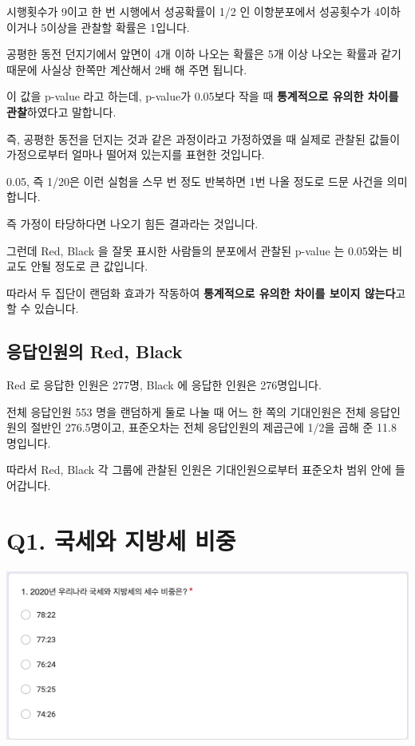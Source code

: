 \documentclass[
]{book}
\begin{document}
시행횟수가 9이고 한 번 시행에서 성공확률이 1/2 인 이항분포에서 성공횟수가 4이하이거나 5이상을 관찰할 확률은 1입니다.

공평한 동전 던지기에서 앞면이 4개 이하 나오는 확률은 5개 이상 나오는 확률과 같기 때문에 사실상 한쪽만 계산해서 2배 해 주면 됩니다.

이 값을 p-value 라고 하는데, p-value가 0.05보다 작을 때 \textbf{통계적으로 유의한 차이를 관찰}하였다고 말합니다.

즉, 공평한 동전을 던지는 것과 같은 과정이라고 가정하였을 때 실제로 관찰된 값들이 가정으로부터 얼마나 떨어져 있는지를 표현한 것입니다.

0.05, 즉 1/20은 이런 실험을 스무 번 정도 반복하면 1번 나올 정도로 드문 사건을 의미합니다.

즉 가정이 타당하다면 나오기 힘든 결과라는 것입니다.

그런데 Red, Black 을 잘못 표시한 사람들의 분포에서 관찰된 p-value 는 0.05와는 비교도 안될 정도로 큰 값입니다.

따라서 두 집단이 랜덤화 효과가 작동하여 \textbf{통계적으로 유의한 차이를 보이지 않는다}고 할 수 있습니다.

\subsection{응답인원의 Red, Black}\label{uxc751uxb2f5uxc778uxc6d0uxc758-red-black-2}

Red 로 응답한 인원은 277명, Black 에 응답한 인원은 276명입니다.

전체 응답인원 553 명을 랜덤하게 둘로 나눌 때 어느 한 쪽의 기대인원은 전체 응답인원의 절반인 276.5명이고, 표준오차는 전체 응답인원의 제곱근에 1/2을 곱해 준 11.8 명입니다.

따라서 Red, Black 각 그룹에 관찰된 인원은 기대인원으로부터 표준오차 범위 안에 들어갑니다.

\section{Q1. 국세와 지방세 비중}\label{q1.-uxad6duxc138uxc640-uxc9c0uxbc29uxc138-uxbe44uxc911}

\includegraphics[width=0.75\linewidth]{./pics/Quiz230315_Q1}
\end{document}
